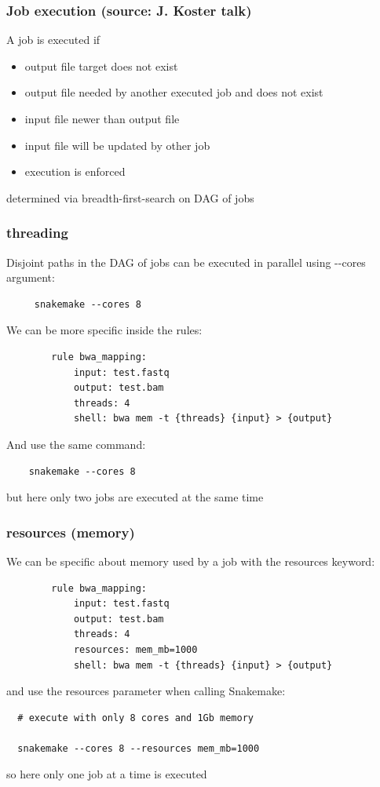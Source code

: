 \documentclass{beamer}
\begin{document}
\begin{frame}
\frametitle{Job execution \tiny{(source: J. Koster talk)}}
 A job is executed if
 \begin{itemize}
 \item  output file target does not exist
 \item  output file needed by another executed job and does not exist
 \item  input file newer than output file
 \item  input file will be updated by other job
 \item  execution is enforced
\end{itemize}
determined via breadth-first-search on DAG of jobs 
\end{frame}





\begin{frame}[fragile]
\frametitle{threading}
Disjoint paths in the DAG of jobs can be executed in parallel using -\--cores 
argument:
\begin{lstlisting}
     snakemake --cores 8
\end{lstlisting}
We can be more specific inside the rules:
\begin{lstlisting}
        rule bwa_mapping:
            input: test.fastq
            output: test.bam
            threads: 4 
            shell: bwa mem -t {threads} {input} > {output}
\end{lstlisting}
 And use the same command:
 \begin{lstlisting}
    snakemake --cores 8
 \end{lstlisting}
 but here only two jobs are executed at the same time
\end{frame}
 
 
\begin{frame}[fragile]
\frametitle{resources (memory)}
We can be specific about memory used by a job with the resources keyword:
\begin{lstlisting}
        rule bwa_mapping:
            input: test.fastq
            output: test.bam
            threads: 4 
            resources: mem_mb=1000
            shell: bwa mem -t {threads} {input} > {output}
 \end{lstlisting}
  
and use the resources parameter when calling Snakemake:  
  \begin{lstlisting}
  # execute with only 8 cores and 1Gb memory
  
  snakemake --cores 8 --resources mem_mb=1000
  \end{lstlisting}   
  
  so here only one job at a time is executed
  
\end{frame}
 
\end{document}
